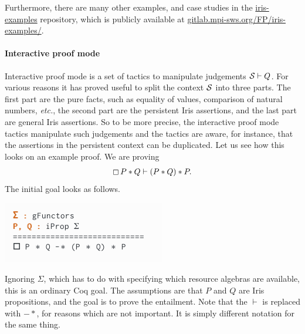 Furthermore, there are many other examples, and case studies in the \href{https://gitlab.mpi-sws.org/FP/iris-examples/}{iris-examples} repository, which is publicly available at \href{https://gitlab.mpi-sws.org/FP/iris-examples/}{gitlab.mpi-sws.org/FP/iris-examples/}.

\paragraph*{Interactive proof mode}
Interactive proof mode is a set of tactics to manipulate judgements $\mathcal{S} \vdash Q$. 
For various reasons it has proved useful to split the context $\mathcal{S}$ into three parts.
The first part are the pure facts, such as equality of values, comparison of natural numbers, \emph{etc.}, the second part are the persistent Iris assertions, and the last part are general Iris assertions.
So to be more precise, the interactive proof mode tactics manipulate such judgements and the tactics are aware, for instance, that the assertions in the persistent context can be duplicated.
Let us see how this looks on an example proof.
We are proving
\begin{align*}
  \mathop{\boxempty} P \ast Q \vdash (P \ast Q) \ast P.
\end{align*}
The initial goal looks as follows.
\begin{center}
  \includegraphics[scale=0.7]{sections/graphics/proofmode-0.png}
\end{center}
Ignoring $\Sigma$, which has to do with specifying which resource algebras are available, this is an ordinary Coq goal.
The assumptions are that $P$ and $Q$ are Iris propositions, and the goal is to prove the entailment.
Note that the $\vdash$ is replaced with $-\ast$, for reasons which are not important.
It is simply different notation for the same thing.

